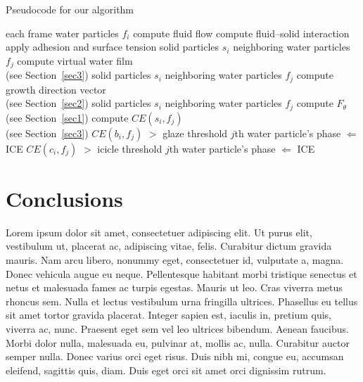 \documentclass[AMA,Times1COL]{WileyNJDv5} %
\begin{document}
\begin{algorithm}
\caption{\enskip Pseudocode for our algorithm}\label{alg1}
\begin{algorithmic}
  \For each frame
  \For water particles $f_{i}$
  \State compute fluid flow \cite{Hirt1974}
  \State compute fluid--solid interaction \cite{Benson1992}
  \State apply adhesion and surface tension \cite{Margolin2003}
  \EndFor
   \For solid particles $s_{i}$
   \For neighboring water particles $f_{j}$
   \State compute virtual water film \\(see Section~\ref{sec3})
   \EndFor
   \EndFor
   \For solid particles $s_{i}$
   \For neighboring water particles $f_{j}$
   \State compute growth direction vector \\(see Section~\ref{sec2})
   \EndFor
   \EndFor
   \For solid particles $s_{i}$
   \For neighboring water particles $f_{j}$
   \State compute $F_{\theta}$ (see Section~\ref{sec1})
   \State compute $CE(s_{i},f_{j})$ \\(see Section~\ref{sec3})
   \If $CE(b_{i}, f_{j})$ $>$ glaze threshold
   \State $j$th water particle's phase $\Leftarrow$ ICE
   \EndIf
   \If $CE(c_{i}, f_{j})$ $>$ icicle threshold
   \State $j$th water particle's phase $\Leftarrow$ ICE
   \EndIf
   \EndFor
   \EndFor
  \EndFor
\end{algorithmic}
\end{algorithm}



\section{Conclusions}\label{sec5}

Lorem ipsum dolor sit amet, consectetuer adipiscing elit. Ut purus elit, vestibulum ut, placerat ac, adipiscing vitae,
felis. Curabitur dictum gravida mauris. Nam arcu libero, nonummy eget, consectetuer id, vulputate a, magna. Donec
vehicula augue eu neque. Pellentesque habitant morbi tristique senectus et netus et malesuada fames ac turpis egestas.
Mauris ut leo. Cras viverra metus rhoncus sem. Nulla et lectus vestibulum urna fringilla ultrices. Phasellus eu tellus
sit amet tortor gravida placerat. Integer sapien est, iaculis in, pretium quis, viverra ac, nunc. Praesent eget sem vel
leo ultrices bibendum. Aenean faucibus. Morbi dolor nulla, malesuada eu, pulvinar at, mollis ac, nulla. Curabitur
auctor semper nulla. Donec varius orci eget risus. Duis nibh mi, congue eu, accumsan eleifend, sagittis quis, diam.
Duis eget orci sit amet orci dignissim rutrum.
\end{document}
